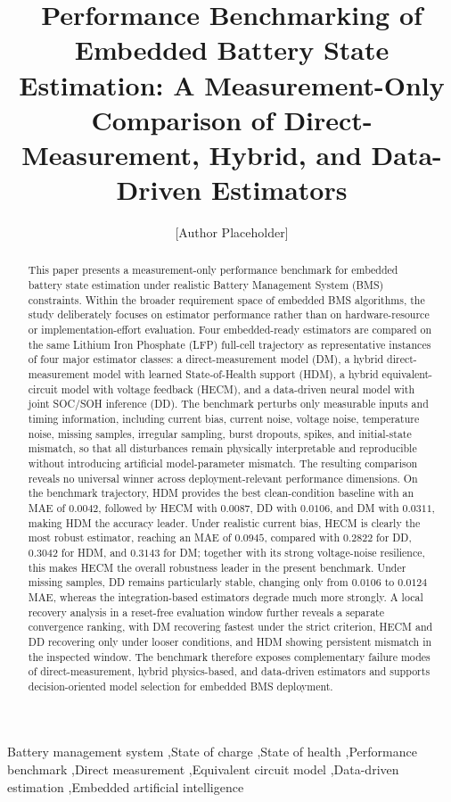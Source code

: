 \documentclass[review,nopreprintline]{elsarticle}
\date{}
\begin{document}
\linenumbers
\begin{frontmatter}
\title{Performance Benchmarking of Embedded Battery State Estimation: A Measurement-Only Comparison of Direct-Measurement, Hybrid, and Data-Driven Estimators}
\author[1]{[Author Placeholder]}
\begin{abstract}
This paper presents a measurement-only performance benchmark for embedded battery state estimation under realistic Battery Management System (BMS) constraints. Within the broader requirement space of embedded BMS algorithms, the study deliberately focuses on estimator performance rather than on hardware-resource or implementation-effort evaluation. Four embedded-ready estimators are compared on the same Lithium Iron Phosphate (LFP) full-cell trajectory as representative instances of four major estimator classes: a direct-measurement model (DM), a hybrid direct-measurement model with learned State-of-Health support (HDM), a hybrid equivalent-circuit model with voltage feedback (HECM), and a data-driven neural model with joint SOC/SOH inference (DD). The benchmark perturbs only measurable inputs and timing information, including current bias, current noise, voltage noise, temperature noise, missing samples, irregular sampling, burst dropouts, spikes, and initial-state mismatch, so that all disturbances remain physically interpretable and reproducible without introducing artificial model-parameter mismatch. The resulting comparison reveals no universal winner across deployment-relevant performance dimensions. On the benchmark trajectory, HDM provides the best clean-condition baseline with an MAE of $0.0042$, followed by HECM with $0.0087$, DD with $0.0106$, and DM with $0.0311$, making HDM the accuracy leader. Under realistic current bias, HECM is clearly the most robust estimator, reaching an MAE of $0.0945$, compared with $0.2822$ for DD, $0.3042$ for HDM, and $0.3143$ for DM; together with its strong voltage-noise resilience, this makes HECM the overall robustness leader in the present benchmark. Under missing samples, DD remains particularly stable, changing only from $0.0106$ to $0.0124$ MAE, whereas the integration-based estimators degrade much more strongly. A local recovery analysis in a reset-free evaluation window further reveals a separate convergence ranking, with DM recovering fastest under the strict criterion, HECM and DD recovering only under looser conditions, and HDM showing persistent mismatch in the inspected window. The benchmark therefore exposes complementary failure modes of direct-measurement, hybrid physics-based, and data-driven estimators and supports decision-oriented model selection for embedded BMS deployment.
\end{abstract}
\begin{keyword}
Battery management system \sep State of charge \sep State of health \sep Performance benchmark \sep Direct measurement \sep Equivalent circuit model \sep Data-driven estimation \sep Embedded artificial intelligence
\end{keyword}
\end{frontmatter}
\end{document}
